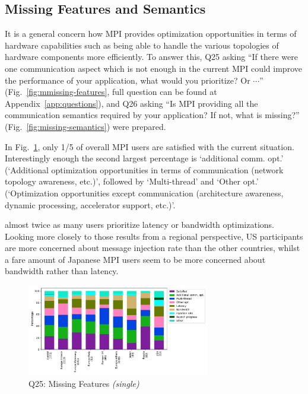 \documentclass[conference,10pt,letterpaper]{IEEEtran}
\def\myquote#1{`#1'}
\begin{document}
\subsection{Missing Features and Semantics}

It is a general concern how MPI provides optimization
opportunities in terms of hardware capabilities such as being able to
handle the various topologies of hardware components more 
efficiently. To answer this, Q25 asking ``If there were one
communication aspect which is not enough in the current MPI could
improve the performance of your application, what would you
prioritize? Or $\cdots$'' (Fig.~\ref{fig:mmissing-features}, full
question can be found at Appendix~\ref{app:questions}), and Q26 asking
``Is MPI providing all the communication semantics required by your
application? If not, what is missing?''
(Fig.~\ref{fig:missing-semantics}) were prepared. 

In Fig.~\ref{fig:missing-features}, only 1/5 of overall MPI users
are satisfied with the current situation.
Interestingly enough the second largest percentage is
\myquote{additional comm. opt.} (\myquote{Additional optimization
  opportunities in terms of communication (network topology awareness,
  etc.)}, followed by \myquote{Multi-thread} and \myquote{Other
  opt.} (\myquote{Optimization opportunities except communication
  (architecture awareness, dynamic processing, accelerator support,
  etc.)}. 

almost twice as many users prioritize latency
or bandwidth optimizations. Looking more closely to those results from
a regional perspective, US participants are more concerned about
message injection rate than the other countries, whilst a fare amount
of Japanese MPI users seem to be more concerned about bandwidth rather
than latency.  

\begin{figure}[htb]
\begin{center}
\includegraphics[width=8cm]{Figs/Q25.pdf}
\caption{Q25: Missing Features {\it(single)}}
\label{fig:missing-features}
\end{center}
\end{figure}
\end{document}
